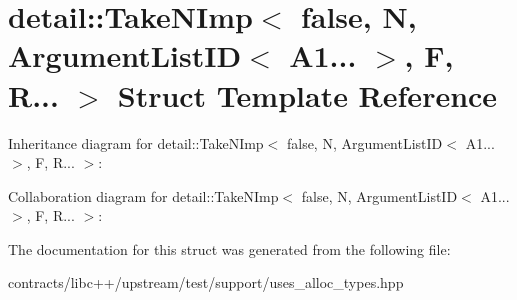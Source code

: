 \hypertarget{structdetail_1_1_take_n_imp_3_01false_00_01_n_00_01_argument_list_i_d_3_01_a1_8_8_8_01_4_00_01_f_00_01_r_8_8_8_01_4}{}\section{detail\+:\+:Take\+N\+Imp$<$ false, N, Argument\+List\+ID$<$ A1... $>$, F, R... $>$ Struct Template Reference}
\label{structdetail_1_1_take_n_imp_3_01false_00_01_n_00_01_argument_list_i_d_3_01_a1_8_8_8_01_4_00_01_f_00_01_r_8_8_8_01_4}


Inheritance diagram for detail\+:\+:Take\+N\+Imp$<$ false, N, Argument\+List\+ID$<$ A1... $>$, F, R... $>$\+:


Collaboration diagram for detail\+:\+:Take\+N\+Imp$<$ false, N, Argument\+List\+ID$<$ A1... $>$, F, R... $>$\+:


The documentation for this struct was generated from the following file\+:\begin{DoxyCompactItemize}
\item 
contracts/libc++/upstream/test/support/uses\+\_\+alloc\+\_\+types.\+hpp\end{DoxyCompactItemize}
